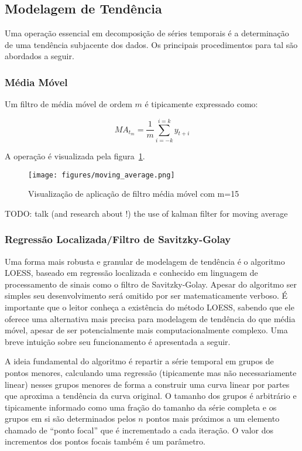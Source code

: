\subsection{Modelagem de Tendência}

Uma operação essencial em decomposição de séries temporais é a determinação
de uma tendência subjacente dos dados. Os principais procedimentos para tal
são abordados a seguir.

\subsubsection{Média Móvel}

Um filtro de média móvel de ordem $m$ é tipicamente expressado como:

\begin{equation}\label{eq:ma}
    MA_{t_{m}} = \frac{1}{m} \sum_{i=-k}^{i=k} y_{t+i}
\end{equation}

A operação é visualizada pela figura~\ref{fig:MA}.

\begin{figure}[H]
    \centering
    \texttt{[image: figures/moving\_average.png]}
    \caption{Visualização de aplicação de filtro média móvel com m=15}
    \label{fig:MA}
\end{figure}

TODO: talk (and research about !) the use of kalman filter for moving average

\subsubsection{Regressão Localizada/Filtro de Savitzky-Golay}

Uma forma mais robusta e granular de modelagem de tendência é o algoritmo
LOESS, baseado em regressão localizada e conhecido em linguagem de processamento
de sinais como o filtro de Savitzky-Golay. Apesar do algoritmo ser simples
seu desenvolvimento será omitido por ser matematicamente verboso. É importante
que o leitor conheça a existência do método LOESS, sabendo que ele oferece uma
alternativa mais precisa para modelagem de tendência do que média móvel,
apesar de ser potencialmente mais computacionalmente complexo. Uma breve
intuição sobre seu funcionamento é apresentada a seguir.

A ideia fundamental do algoritmo é repartir a série temporal em grupos de
pontos menores, calculando uma regressão (tipicamente mas não necessariamente
linear) nesses grupos menores de forma a construir uma curva linear por partes
que aproxima a tendência da curva original. O tamanho dos grupos é arbitrário
e tipicamente informado como uma fração do tamanho da série completa e os grupos
em si são determinados pelos $n$ pontos mais próximos a um elemento chamado de
``ponto focal'' que é incrementado a cada iteração. O valor dos incrementos dos
pontos focais também é um parâmetro.

